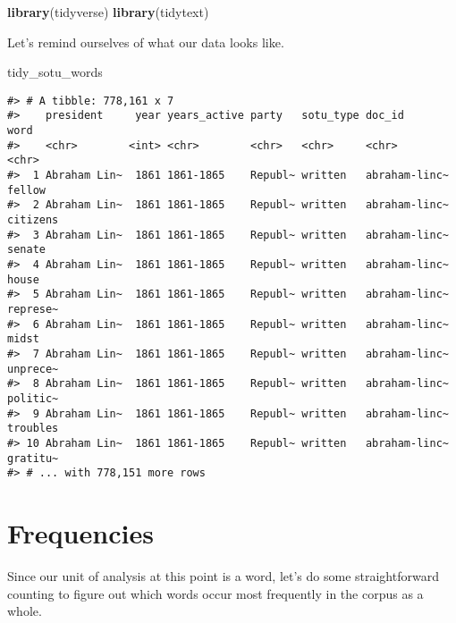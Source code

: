 \documentclass[]{book}
\newenvironment{Shaded}{\begin{snugshade}}{\end{snugshade}}
\newcommand{\DataTypeTok}[1]{\textcolor[rgb]{0.13,0.29,0.53}{#1}}
\newcommand{\KeywordTok}[1]{\textcolor[rgb]{0.13,0.29,0.53}{\textbf{#1}}}
\newcommand{\NormalTok}[1]{#1}
\newcommand{\OperatorTok}[1]{\textcolor[rgb]{0.81,0.36,0.00}{\textbf{#1}}}
\newcommand{\OtherTok}[1]{\textcolor[rgb]{0.56,0.35,0.01}{#1}}
\newcommand{\StringTok}[1]{\textcolor[rgb]{0.31,0.60,0.02}{#1}}
\begin{document}
\begin{Shaded}
\begin{Highlighting}[]
\KeywordTok{library}\NormalTok{(tidyverse)}
\KeywordTok{library}\NormalTok{(tidytext)}
\end{Highlighting}
\end{Shaded}

Let's remind ourselves of what our data looks like.

\begin{Shaded}
\begin{Highlighting}[]
\NormalTok{tidy_sotu_words}
\end{Highlighting}
\end{Shaded}

\begin{verbatim}
#> # A tibble: 778,161 x 7
#>    president     year years_active party   sotu_type doc_id        word    
#>    <chr>        <int> <chr>        <chr>   <chr>     <chr>         <chr>   
#>  1 Abraham Lin~  1861 1861-1865    Republ~ written   abraham-linc~ fellow  
#>  2 Abraham Lin~  1861 1861-1865    Republ~ written   abraham-linc~ citizens
#>  3 Abraham Lin~  1861 1861-1865    Republ~ written   abraham-linc~ senate  
#>  4 Abraham Lin~  1861 1861-1865    Republ~ written   abraham-linc~ house   
#>  5 Abraham Lin~  1861 1861-1865    Republ~ written   abraham-linc~ represe~
#>  6 Abraham Lin~  1861 1861-1865    Republ~ written   abraham-linc~ midst   
#>  7 Abraham Lin~  1861 1861-1865    Republ~ written   abraham-linc~ unprece~
#>  8 Abraham Lin~  1861 1861-1865    Republ~ written   abraham-linc~ politic~
#>  9 Abraham Lin~  1861 1861-1865    Republ~ written   abraham-linc~ troubles
#> 10 Abraham Lin~  1861 1861-1865    Republ~ written   abraham-linc~ gratitu~
#> # ... with 778,151 more rows
\end{verbatim}

\hypertarget{frequencies}{%
\section{Frequencies}\label{frequencies}}

Since our unit of analysis at this point is a word, let's do some straightforward counting to figure out which words occur most frequently in the corpus as a whole.

\begin{Shaded}
\end{Shaded}
\end{document}
